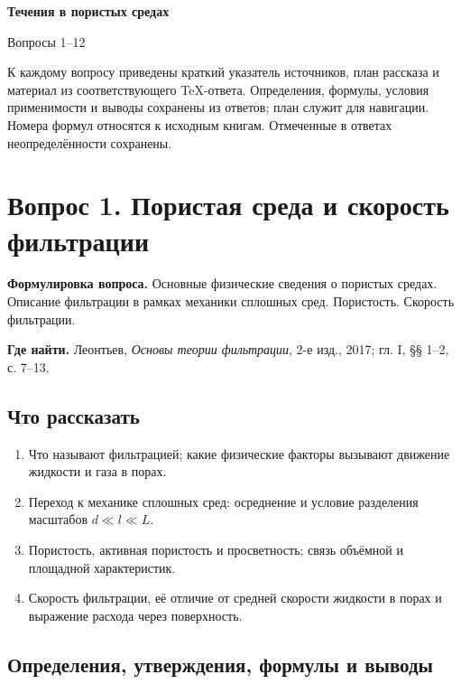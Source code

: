 \documentclass[12pt,a4paper]{article}
\newcounter{questionnumber}
\begin{document}
\begin{center}
{\LARGE\bfseries Течения в пористых средах\par}
\medskip
{\Large Вопросы 1--12\par}
\end{center}
\noindent К каждому вопросу приведены краткий указатель источников, план рассказа и материал из соответствующего TeX-ответа. Определения, формулы, условия применимости и выводы сохранены из ответов; план служит для навигации. Номера формул относятся к исходным книгам. Отмеченные в ответах неопределённости сохранены.
\tableofcontents

\clearpage
\setcounter{questionnumber}{1}
\setcounter{equation}{0}
\setcounter{footnote}{0}
\section*{Вопрос 1. Пористая среда и скорость фильтрации}
\textbf{Формулировка вопроса.} Основные физические сведения о пористых средах. Описание фильтрации в рамках механики сплошных сред. Пористость. Скорость фильтрации.

\medskip
\textbf{Где найти.} Леонтьев, \textit{Основы теории фильтрации}, 2-е изд., 2017; гл. I, §§ 1--2, с. 7--13.

\subsection*{Что рассказать}
\begin{enumerate}
\item Что называют фильтрацией; какие физические факторы вызывают движение жидкости и газа в порах.
\item Переход к механике сплошных сред: осреднение и условие разделения масштабов $d\ll l\ll L$.
\item Пористость, активная пористость и просветность; связь объёмной и площадной характеристик.
\item Скорость фильтрации, её отличие от средней скорости жидкости в порах и выражение расхода через поверхность.
\end{enumerate}
\subsection*{Определения, утверждения, формулы и выводы}
\begingroup
\newcommand{\source}[2]{\par\nobreak\smallskip{\small Н. Е. Леонтьев. \textit{Основы теории фильтрации}. 2-е изд., 2017. Глава I, §~#1, с.~#2.}\par\medskip}
\end{document}
